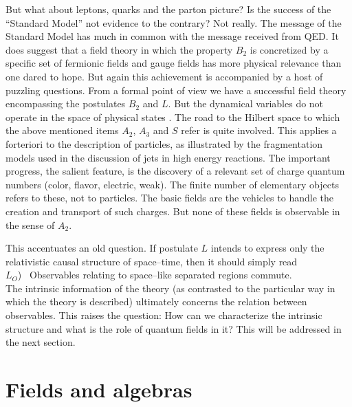 But what about leptons, quarks and the parton picture? Is the success
of the ``Standard Model'' not evidence to the contrary? Not really. The
message of the Standard Model has much in common with the message
received from QED. It does suggest that a field theory in which the
property $B_2$ is concretized by a specific set of fermionic fields and
gauge fields has more physical relevance than one dared to hope. But
again this achievement is accompanied by a host of puzzling
questions. {}From a formal point of view we have a successful field
theory encompassing the postulates $B_2$ and $L$. But the dynamical
variables do not operate in the space of 
physical states \cite{St,KuOj}. The road to
the Hilbert space to which the above mentioned items $A_2$, $A_3$ and
$S$ refer is quite involved. This applies a forteriori to the description
of particles, as illustrated by the fragmentation models used in the
discussion of jets in high energy reactions. The important progress,
the salient feature, is the discovery of a relevant set of charge
quantum numbers (color, flavor, electric, weak). The finite number of
elementary objects refers to these, not to particles. The basic fields
are the vehicles to handle the creation and transport of such
charges. But none of these fields is observable in the sense of $A_2$.

This accentuates an old question. If postulate $L$ intends to express
only the relativistic causal structure of space--time, then it should
simply read\\[2mm]
$L_O$) \ Observables relating to space--like separated regions
commute. \\[2mm]
The intrinsic information of the theory (as contrasted to the
particular way in which the theory is described) ultimately concerns
the relation between observables. This raises the question: How can we
characterize the intrinsic structure and what is the role of quantum
fields in it? This will be addressed in the next section.

\section{Fields and algebras}
\setcounter{equation}{0} 

